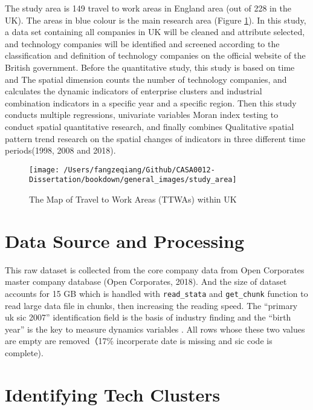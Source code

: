 \documentclass[
  12pt,
  oneside]{book}
\begin{document}
The study area is 149 travel to work areas in England area (out of 228 in the UK). The areas in blue colour is the main research area (Figure \ref{fig:fig-study-area}). In this study, a data set containing all companies in UK will be cleaned and attribute selected, and technology companies will be identified and screened according to the classification and definition of technology companies on the official website of the British government. Before the quantitative study, this study is based on time and The spatial dimension counts the number of technology companies, and calculates the dynamic indicators of enterprise clusters and industrial combination indicators in a specific year and a specific region. Then this study conducts multiple regressions, univariate variables Moran index testing to conduct spatial quantitative research, and finally combines Qualitative spatial pattern trend research on the spatial changes of indicators in three different time periods(1998, 2008 and 2018).

\begin{figure}
\texttt{[image: /Users/fangzeqiang/Github/CASA0012-Dissertation/bookdown/general\_images/study\_area]} \caption{The Map of Travel to Work Areas (TTWAs) within UK}\label{fig:fig-study-area}
\end{figure}

\hypertarget{data-source-and-processing}{%
\section{Data Source and Processing}\label{data-source-and-processing}}

This raw dataset is collected from the core company data from Open Corporates master company database (Open Corporates, 2018). And the size of dataset accounts for 15 GB which is handled with \texttt{read\_stata} and \texttt{get\_chunk} function to read large data file in chunks, then increasing the reading speed. The ``primary uk sic 2007'' identification field is the basis of industry finding and the ``birth year'' is the key to measure dynamics variables . All rows whose these two values are empty are removed（17\% incorperate date is missing and sic code is complete).

\hypertarget{identifying-tech-clusters}{%
\section{Identifying Tech Clusters}\label{identifying-tech-clusters}}
\end{document}
